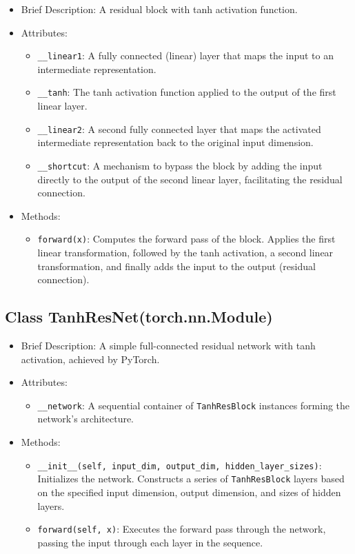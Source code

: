\begin{itemize}
\item Brief Description: A residual block with tanh activation function.
\item Attributes:
  \begin{itemize}
  \item \lstinline|__linear1|: A fully connected (linear) layer that maps the input to an intermediate representation.
  \item \lstinline|__tanh|: The tanh activation function applied to the output of the first linear layer.
  \item \lstinline|__linear2|: A second fully connected layer that maps the activated intermediate representation back to the original input dimension.
  \item \lstinline|__shortcut|: A mechanism to bypass the block by adding the input directly to the output of the second linear layer, facilitating the residual connection.
  \end{itemize}
\item Methods:
  \begin{itemize}
  \item \lstinline|forward(x)|:
  Computes the forward pass of the block. 
  Applies the first linear transformation, followed by the tanh activation, 
  a second linear transformation, 
  and finally adds the input to the output (residual connection).
  \end{itemize}
\end{itemize}

\subsection{Class TanhResNet(torch.nn.Module)}

\begin{itemize}
\item Brief Description: A simple full-connected residual network with tanh activation,
  achieved by PyTorch.
\item Attributes:
  \begin{itemize}
  \item \lstinline|__network|: 
  A sequential container of \lstinline|TanhResBlock| instances 
  forming the network's architecture.
  \end{itemize}
\item Methods:
  \begin{itemize}
  \item \lstinline|__init__(self, input_dim, output_dim, hidden_layer_sizes)|: Initializes the network. Constructs a series of \lstinline|TanhResBlock| layers based on the specified input dimension, output dimension, and sizes of hidden layers.
  \item \lstinline|forward(self, x)|: Executes the forward pass through the network, passing the input through each layer in the sequence.
  \end{itemize}
\end{itemize}

